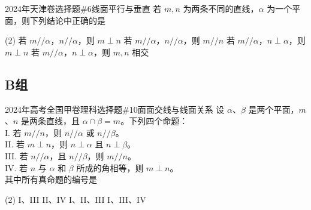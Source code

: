 \begin{choice}{2024年天津卷选择题\#6}{线面平行与垂直}
	若 $m,n$ 为两条不同的直线，$\alpha$ 为一个平面，则下列结论中正确的是
	\begin{tasks}(2)
		\task 若 $m//\alpha$，$n//\alpha$，则 $m\perp n$
		\task 若 $m//\alpha$，$n//\alpha$，则 $m//n$
		\task 若 $m//\alpha$，$n\perp\alpha$，则 $m\perp n$
		\task 若 $m//\alpha$，$n\perp\alpha$，则 $m,n$ 相交
	\end{tasks}
\end{choice}

\subsection*{B组}

\begin{choice}{2024年高考全国甲卷理科选择题\#10}{面面交线与线面关系}
	设 $\alpha$、$\beta$ 是两个平面，$m$、$n$ 是两条直线，且 $\alpha\cap\beta=m$。下列四个命题：\\
	I. 若 $m//n$，则 $n//\alpha$ 或 $n//\beta$。\\
	II. 若 $m\perp n$，则 $n\perp\alpha$ 且 $n\perp\beta$。\\
	III. 若 $n//\alpha$，且 $n//\beta$，则 $m//n$。\\
	IV. 若 $n$ 与 $\alpha$ 和 $\beta$ 所成的角相等，则 $m\perp n$。\\
	其中所有真命题的编号是
	\begin{tasks}(2)
		\task I、III
		\task II、IV
		\task I、II、III
		\task I、III、IV
	\end{tasks}
\end{choice}

\stopexercise
